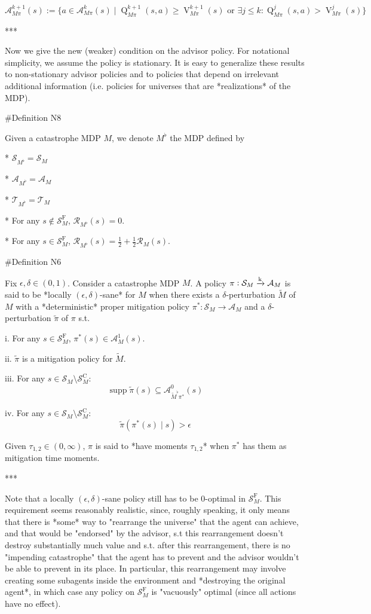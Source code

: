 \documentclass[a4paper]{article}
\DeclareMathOperator{\Supp}{supp}
\newcommand{\AP}[1]{\left(#1\right)}
\newcommand{\M}{\xrightarrow{\textnormal{k}}}
\newcommand{\A}{\mathcal{A}}
\newcommand{\St}{\mathcal{S}}
\newcommand{\T}{\mathcal{T}}
\newcommand{\R}{\mathcal{R}}
\newcommand{\RMC}{\mathrm{C}}
\newcommand{\RMF}{\mathrm{F}}
\newcommand{\SF}{\St^{\RMF}}
\newcommand{\SC}{\St^{\RMC}}
\newcommand{\V}{\operatorname{V}}
\newcommand{\Q}{\operatorname{Q}}
\begin{document}
$$\A_{M\pi}^{k+1}(s) := \{a \in \A_{M\pi}^k(s) \mid \Q_{M\pi}^{k+1}(s,a) \geq \V_{M\pi}^{k+1}(s) \text{ or } \exists j \leq k: \Q_{M\pi}^{j}(s,a) > \V_{M\pi}^{j}(s)\}$$

***

Now we give the new (weaker) condition on the advisor policy. For notational simplicity, we assume the policy is stationary. It is easy to generalize these results to non-stationary advisor policies and to policies that depend on irrelevant additional information (i.e. policies for universes that are *realizations* of the MDP).

\#Definition N8

Given a catastrophe MDP $M$, we denote $M^\flat$ the MDP defined by

* $\St_{M^\flat} = \St_M$

* $\A_{M^\flat} = \A_M$

* $\T_{M^\flat} = \T_M$

* For any $s\not\in\SF_M$, $\R_{M^\flat}(s) = 0$.

* For any $s \in \SF_M$, $\R_{M^\flat}(s) = \frac{1}{2} + \frac{1}{2}\R_M(s)$.

\#Definition N6

Fix $\epsilon,\delta \in (0,1)$. Consider a catastrophe MDP $M$. A policy $\pi: \St_M \M \A_M$ is said to be *locally $(\epsilon,\delta)$-sane* for $M$ when there exists a $\delta$-perturbation $\tilde{M}$ of $M$ with a *deterministic* proper mitigation policy $\pi^*: \St_M \rightarrow \A_M$ and a $\delta$-perturbation $\tilde{\pi}$ of $\pi$ s.t.

i. For any $s \in \SF_M$, $\pi^*(s) \in \A^1_{M}(s)$.

ii. $\tilde{\pi}$ is a mitigation policy for $\tilde{M}$.

iii. For any $s \in \St_M \setminus \SC_M$: $$\Supp{\tilde{\pi}(s)} \subseteq \A_{\tilde{M}^\flat\pi^*}^0(s)$$

iv. For any $s \in \St_M \setminus \SC_M$: $$\tilde{\pi}\AP{\pi^*(s) \mid s} > \epsilon$$


Given $\tau_{1,2} \in (0,\infty)$, $\pi$ is said to *have moments $\tau_{1,2}$* when $\pi^*$ has them as mitigation time moments.

***

Note that a locally $(\epsilon,\delta)$-sane policy still has to be $0$-optimal in $\SF_M$. This requirement seems reasonably realistic, since, roughly speaking, it only means that there is *some* way to "rearrange the universe" that the agent can achieve, and that would be "endorsed" by the advisor, s.t this rearrangement doesn't destroy substantially much value and s.t. after this rearrangement, there is no "impending catastrophe" that the agent has to prevent and the advisor wouldn't be able to prevent in its place. In particular, this rearrangement may involve creating some subagents inside the environment and *destroying the original agent*, in which case any policy on $\SF_M$ is "vacuously" optimal (since all actions have no effect).
\end{document}
